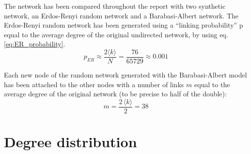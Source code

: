 \documentclass[11pt, twoside]{report}
\begin{document}
The network has been compared throughout the report with two synthetic network, an Erdos-Renyi random network and a Barabasi-Albert network.
The Erdos-Renyi random network has been generated using a ``linking probability'' p equal to the average degree of the original undirected network, by using eq. \ref{eq:ER_probability}.
    \begin{equation}
      p_{ER} \approx \frac{2\langle k  \rangle}{N} = \frac{76}{65729} \approx  0.001
      \label{eq:ER_probability}
    \end{equation}

    Each new node of the random network generated with the Barabasi-Albert model has been attached to the other nodes with a number of links $m$ equal to the average degree of the original network (to be precise to half of the double):
    \begin{equation}
      m = \frac{ 2 \, \langle k \rangle}{2} = 38
      \label{eq:BA_model}
    \end{equation}

    
 \section{Degree distribution}    
\end{document}
